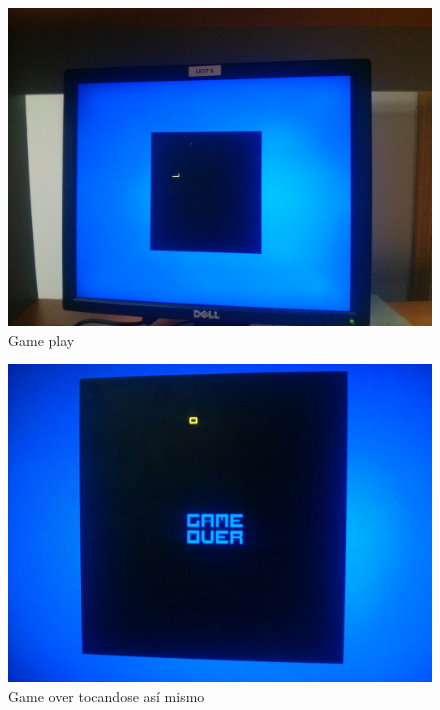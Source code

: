 \documentclass[10pt]{article}
\begin{document}
\begin{figure}[hbtp]
\centering
\includegraphics[width=1\textwidth]{game-play}
\caption{Game play}
\label{vga-play}
\end{figure}

\begin{figure}[hbtp]
\centering
\includegraphics[width=1\textwidth]{game-over}
\caption{Game over tocandose así mismo}
\label{vga-over}
\end{figure}
\end{document}
